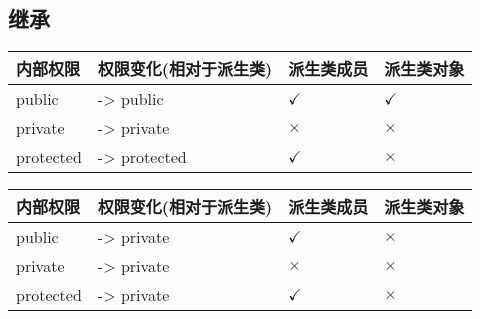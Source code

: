 \documentclass[letterpaper,10pt,english]{sphinxmanual}
\begin{document}
\subsection{继承}
\label{\detokenize{cpp/15_classAccess:id1}}

\begin{savenotes}\sphinxattablestart
\centering
{}
\label{\detokenize{cpp/15_classAccess:id4}}
\sphinxaftercaption
\begin{tabulary}{\linewidth}[t]{|T|T|T|T|}
\hline
\sphinxstyletheadfamily 
内部权限
&\sphinxstyletheadfamily 
权限变化(相对于派生类)
&\sphinxstyletheadfamily 
派生类成员
&\sphinxstyletheadfamily 
派生类对象
\\
\hline
public
&
-\textgreater{} public
&
\(\checkmark\)
&
\(\checkmark\)
\\
\hline
private
&
-\textgreater{} private
&
\(\times\)
&
\(\times\)
\\
\hline
protected
&
-\textgreater{} protected
&
\(\checkmark\)
&
\(\times\)
\\
\hline
\end{tabulary}
\par
\sphinxattableend\end{savenotes}


\begin{savenotes}\sphinxattablestart
\centering
{}
\label{\detokenize{cpp/15_classAccess:id5}}
\sphinxaftercaption
\begin{tabulary}{\linewidth}[t]{|T|T|T|T|}
\hline
\sphinxstyletheadfamily 
内部权限
&\sphinxstyletheadfamily 
权限变化(相对于派生类)
&\sphinxstyletheadfamily 
派生类成员
&\sphinxstyletheadfamily 
派生类对象
\\
\hline
public
&
-\textgreater{} private
&
\(\checkmark\)
&
\(\times\)
\\
\hline
private
&
-\textgreater{} private
&
\(\times\)
&
\(\times\)
\\
\hline
protected
&
-\textgreater{} private
&
\(\checkmark\)
&
\(\times\)
\\
\hline
\end{tabulary}
\par
\sphinxattableend\end{savenotes}
\end{document}
